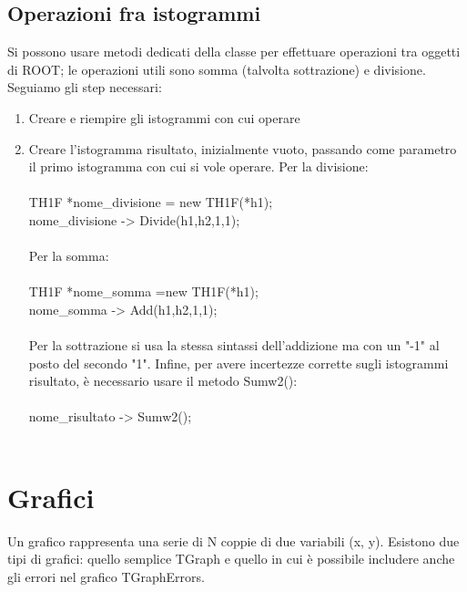 \documentclass[10pt,a4paper]{article}
\begin{document}
\subsection{Operazioni fra istogrammi}
Si possono usare metodi dedicati della classe per effettuare operazioni tra oggetti di ROOT; le operazioni utili sono somma (talvolta sottrazione) e divisione. Seguiamo gli step necessari:
\begin{enumerate}
	\item Creare e riempire gli istogrammi con cui operare
	\item Creare l'istogramma risultato, inizialmente vuoto, passando come parametro il primo istogramma con cui si vole operare. Per la divisione:\\\\
	TH1F *nome\_divisione = new TH1F(*h1);\\
	nome\_divisione -> Divide(h1,h2,1,1);\\\\
	Per la somma:\\\\
	TH1F *nome\_somma =new TH1F(*h1);\\
	nome\_somma -> Add(h1,h2,1,1);\\\\
	Per la sottrazione si usa la stessa sintassi dell'addizione ma con un "-1" al posto del secondo "1". Infine, per avere incertezze corrette sugli istogrammi risultato, è necessario usare il metodo Sumw2():\\\\
	nome\_risultato -> Sumw2();\\\\
\end{enumerate}
\section{Grafici}
Un grafico rappresenta una serie di N coppie di due variabili (x, y). Esistono due tipi di grafici: quello semplice TGraph e quello in cui è possibile includere anche gli errori nel grafico TGraphErrors. 
\end{document}
